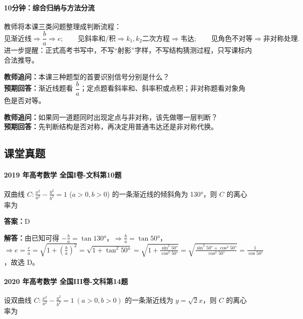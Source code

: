 \documentclass[UTF8,a4paper,11pt]{ctexart}
\begin{document}
\paragraph{10分钟：综合归纳与方法分流}

教师将本课三类问题整理成判断流程：
\[
\text{见渐近线}\Rightarrow\frac{b}{a}\Rightarrow e;
\qquad
\text{见斜率和/积}\Rightarrow k_1,k_2\text{二次方程}\Rightarrow\text{韦达};
\qquad
\text{见角色不对等}\Rightarrow\text{非对称处理}.
\]
进一步提醒：正式高考书写中，不写“射影”字样，不写结构猜测过程，只写课标内合法推导。

\noindent\textbf{教师追问：}本课三种题型的首要识别信号分别是什么？\\

\textbf{预期回答：}渐近线题看 $\dfrac{b}{a}$；定点题看斜率和、斜率积或点积；非对称题看对象角色是否对等。\par

\noindent\textbf{教师追问：}如果同一道题同时出现定点与非对称，该先做哪一层判断？\\

\textbf{预期回答：}先判断结构是否对称，再决定用普通韦达还是非对称代换。\par

\subsection*{课堂真题}

\paragraph{2019 年高考数学 全国I卷-文科第10题}

双曲线 $C: \frac{x^2}{a^2} - \frac{y^2}{b^2} = 1$ ($a>0,b>0$) 的一条渐近线的倾斜角为 130°，则 $C$ 的离心率为

\textbf{答案：}D\par

\textbf{解答：}由已知可得 $-\frac{b}{a} = \tan130°$，$\Rightarrow \frac{b}{a} = \tan50°$，$\Rightarrow e = \frac{c}{a} = \sqrt{1+\left(\frac{b}{a}\right)^2} = \sqrt{1+\tan^2 50°} = \sqrt{1+\frac{\sin^2 50°}{\cos^2 50°}} = \sqrt{\frac{\sin^2 50°+\cos^2 50°}{\cos^2 50°}} = \frac{1}{\cos50°}$，故选 D。

\paragraph{2020 年高考数学 全国III卷-文科第14题}

设双曲线 $C:\frac{x^2}{a^2}-\frac{y^2}{b^2}=1\ (a>0,b>0)$ 的一条渐近线为 $y=\sqrt{2}x$，则 $C$ 的离心率为
\end{document}

